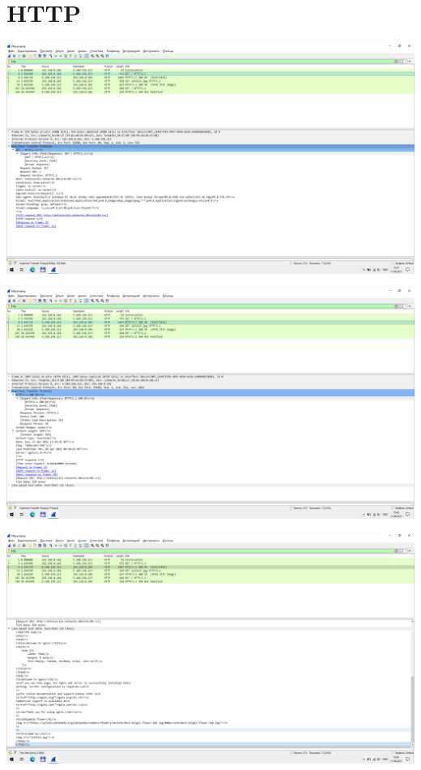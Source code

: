 
\section{HTTP}

\includegraphics[width=\textwidth]{screenshots/http_get_text_request_1}

\includegraphics[width=\textwidth]{screenshots/http_get_text_response_1}

\includegraphics[width=\textwidth]{screenshots/http_get_text_response_2}

